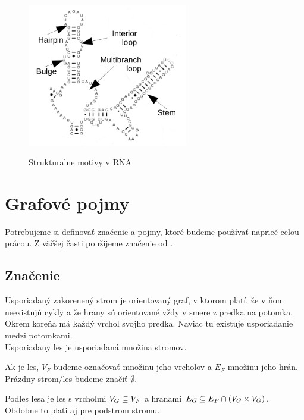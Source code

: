 
\begin{figure}[H]
\centering
\includegraphics[width=70mm, height=70mm]{../img/struktury_v_rna.png}
\caption{Strukturalne motivy v RNA}
\label{obr:RNA_motifs}
\end{figure}

\section{Grafové pojmy}

Potrebujeme si definovať značenie a pojmy, ktoré budeme používať naprieč celou prácou.
Z väčšej časti použijeme značenie od \citet{RTED}.

\subsection{Značenie}

\begin{definice}\label{def:strom}
  Usporiadaný zakorenený strom je orientovaný graf, v ktorom platí, že v ňom neexistujú cykly
  a že hrany sú orientované vždy v smere z predka na potomka.
  Okrem koreňa má každý vrchol svojho predka. Naviac tu existuje usporiadanie medzi potomkami.
  \\
  Usporiadany les je usporiadaná množina stromov.
\end{definice}

Ak  je les, $V_F$ budeme označovať množinu jeho vrcholov a $E_F$ množinu jeho hrán.
Prázdny strom/les budeme značiť $\emptyset$.

Podles lesa  je les  s vrcholmi $V_{G} \subseteq V_{F}$
a hranami $E_{G} \subseteq E_{F} \cap (V_{G} \times V_{G})$.
Obdobne to plati aj pre podstrom stromu.

